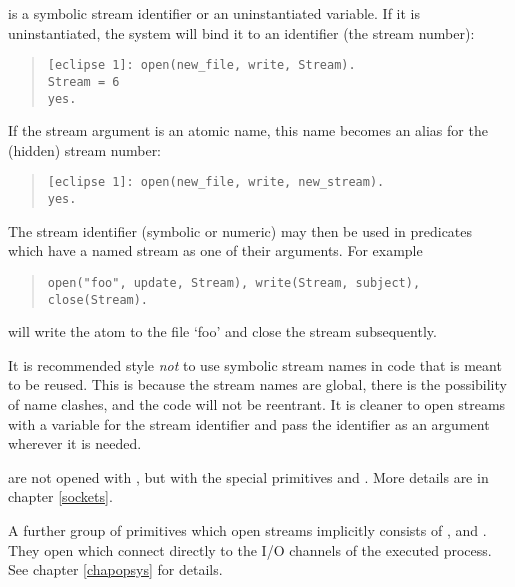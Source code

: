  is a symbolic stream identifier or an uninstantiated variable.
If it is uninstantiated, the system will bind it to an identifier (the stream
number):
\begin{quote}
\begin{verbatim}
[eclipse 1]: open(new_file, write, Stream).
Stream = 6
yes.
\end{verbatim}
\end{quote}
If the stream argument is an atomic name, this name becomes an alias
for the (hidden) stream number:
\begin{quote}
\begin{verbatim}
[eclipse 1]: open(new_file, write, new_stream).
yes.
\end{verbatim}
\end{quote}
The stream identifier (symbolic or numeric) may then be used in predicates
which have a named stream as one of their arguments. For example
\begin{quote}
\begin{verbatim}
open("foo", update, Stream), write(Stream, subject), close(Stream).
\end{verbatim}
\end{quote}
will write the atom
 to the file `foo' and close the stream subsequently.


It is recommended style \emph{not} to use symbolic stream names in code that is
meant to be reused. This is because the stream names are global,
there is the possibility of name clashes, and the code will not be reentrant.
It is cleaner to open streams with a variable for the stream identifier
and pass the identifier as an argument wherever it is needed.


 are not opened with , but with the
special primitives
 and
.
More details are in chapter \ref{sockets}.


A further group of primitives which open streams implicitly consists of
,
and .
They open  which connect directly to the I/O channels of
the executed process. See chapter \ref{chapopsys} for details.



